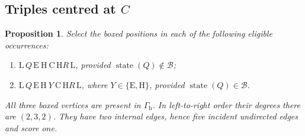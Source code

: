 \documentclass[11pt,a4paper]{article}
\newtheorem{proposition}[theorem]{Proposition}
\theoremstyle{definition}
\theoremstyle{remark}
\newcommand{\E}{\mathrm E}
\newcommand{\HH}{\mathrm H}
\newcommand{\LL}{\mathrm L}
\newcommand{\CC}{\mathrm C}
\newcommand{\Gh}{\Gamma_{\mathrm h}}
\DeclareMathOperator{\state}{state}
\begin{document}
\subsection{Triples centred at \texorpdfstring{$C$}{C}}\label{sec:triples}
\begin{proposition}\label{prop:triples}
Select the boxed positions in each of the following eligible occurrences:
\begin{enumerate}[label=(\roman*)]
\item
$\LL\,Q\,\boxed{\E\ \HH\ \CC}\,\HH R\,\LL$, provided $\state(Q)\notin\mathcal B$;
\item
$\LL\,Q\,\E\,\boxed{\HH\ Y\ \CC}\,\HH R\,\LL$, where $Y\in\{\E,\HH\}$, provided $\state(Q)\in\mathcal B$.
\end{enumerate}
All three boxed vertices are present in $\Gh$. In left-to-right order their degrees there are $(2,3,2)$. They have two internal edges, hence five incident undirected edges and score one.
\end{proposition}
\end{document}
